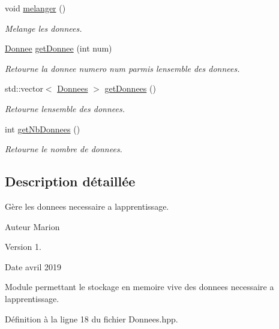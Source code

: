 \begin{DoxyCompactItemize}
\mbox{\label{class_donnees_a722ba74b5e8c6bc0a2f7c16589692ad5}} 
void \hyperlink{class_donnees_a722ba74b5e8c6bc0a2f7c16589692ad5}{melanger} ()
\begin{DoxyCompactList}\small\item\em Melange les donnees. \end{DoxyCompactList}\item 
\hyperlink{class_donnee}{Donnee} \hyperlink{class_donnees_a1986c4b95b3cf90767dbe966b2497ae8}{get\+Donnee} (int num)
\begin{DoxyCompactList}\small\item\em Retourne la donnee numero num parmis l\textquotesingle{}ensemble des donnees. \end{DoxyCompactList}\item 
std\+::vector$<$ \hyperlink{class_donnees}{Donnees} $>$ \hyperlink{class_donnees_acb2f30978cb824d70c39b716c49fe1fa}{get\+Donnees} ()
\begin{DoxyCompactList}\small\item\em Retourne l\textquotesingle{}ensemble des donnees. \end{DoxyCompactList}\item 
int \hyperlink{class_donnees_a4c4da37884b1b91d881524f2a7b91dbc}{get\+Nb\+Donnees} ()
\begin{DoxyCompactList}\small\item\em Retourne le nombre de donnees. \end{DoxyCompactList}\end{DoxyCompactItemize}


\subsection{Description détaillée}
Gère les donnees necessaire a l\textquotesingle{}apprentissage. 

\begin{DoxyAuthor}{Auteur}
Marion 
\end{DoxyAuthor}
\begin{DoxyVersion}{Version}
1. 
\end{DoxyVersion}
\begin{DoxyDate}{Date}
avril 2019
\end{DoxyDate}
Module permettant le stockage en memoire vive des donnees necessaire a l\textquotesingle{}apprentissage. 

Définition à la ligne 18 du fichier Donnees.\+hpp.



